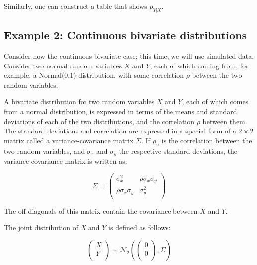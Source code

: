 \documentclass[12pt,]{krantz}
\begin{document}
Similarly, one can construct a table that shows \(p_{Y|X}\).

\hypertarget{example-2-continuous-bivariate-distributions}{%
\subsection{Example 2: Continuous bivariate distributions}\label{example-2-continuous-bivariate-distributions}}

Consider now the continuous bivariate case; this time, we will use simulated data. Consider two normal random variables \(X\) and \(Y\), each of which coming from, for example, a Normal(0,1) distribution, with some correlation \(\rho\) between the two random variables.

A bivariate distribution for two random variables \(X\) and \(Y\), each of which comes from a normal distribution, is expressed in terms of the means and standard deviations of each of the two distributions, and the correlation \(\rho\) between them. The standard deviations and correlation are expressed in a special form of a \(2\times 2\) matrix called a variance-covariance matrix \(\Sigma\). If \(\rho_u\) is the correlation between the two random variables, and \(\sigma _{x}\) and \(\sigma _{y}\) the respective standard deviations, the variance-covariance matrix is written as:

\begin{equation}\label{eq:covmatfoundations}
\Sigma
=
\begin{pmatrix}
\sigma _{x}^2  & \rho\sigma _{x}\sigma _{y}\\
\rho\sigma _{x}\sigma _{y}    & \sigma _{y}^2\\
\end{pmatrix}
\end{equation}

The off-diagonals of this matrix contain the covariance between \(X\) and \(Y\).

The joint distribution of \(X\) and \(Y\) is defined as follows:

\begin{equation}\label{eq:jointpriordistfoundations}
\begin{pmatrix}
  X \\ 
  Y \\
\end{pmatrix}
\sim 
\mathcal{N}_2 \left(
\begin{pmatrix}
  0 \\
  0 \\
\end{pmatrix},
\Sigma
\right)
\end{equation}
\end{document}
